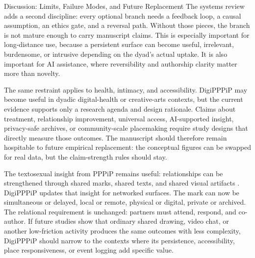 \documentclass[
  ignorenonframetext,
]{beamer}
\begin{document}
\begin{frame}[allowframebreaks]{Discussion: Limits, Failure Modes, and
Future Replacement}
The systems review adds a second discipline: every optional branch needs
a feedback loop, a causal assumption, an ethics gate, and a reversal
path. Without those pieces, the branch is not mature enough to carry
manuscript claims. This is especially important for long-distance use,
because a persistent surface can become useful, irrelevant, burdensome,
or intrusive depending on the dyad's actual uptake. It is also important
for AI assistance, where reversibility and authorship clarity matter
more than novelty.

The same restraint applies to health, intimacy, and accessibility.
DigiPPPiP may become useful in dyadic digital-health or creative-arts
contexts, but the current evidence supports only a research agenda and
design rationale. Claims about treatment, relationship improvement,
universal access, AI-supported insight, privacy-safe archives, or
community-scale placemaking require study designs that directly measure
those outcomes. The manuscript should therefore remain hospitable to
future empirical replacement: the conceptual figures can be swapped for
real data, but the claim-strength rules should stay.

The textosexual insight from PPPiP remains useful: relationships can be
strengthened through shared marks, shared texts, and shared visual
artifacts . DigiPPPiP updates that insight for
networked surfaces. The mark can now be simultaneous or delayed, local
or remote, physical or digital, private or archived. The relational
requirement is unchanged: partners must attend, respond, and co-author.
If future studies show that ordinary shared drawing, video chat, or
another low-friction activity produces the same outcomes with less
complexity, DigiPPPiP should narrow to the contexts where its
persistence, accessibility, place responsiveness, or event logging add
specific value.
\end{frame}
\end{document}
